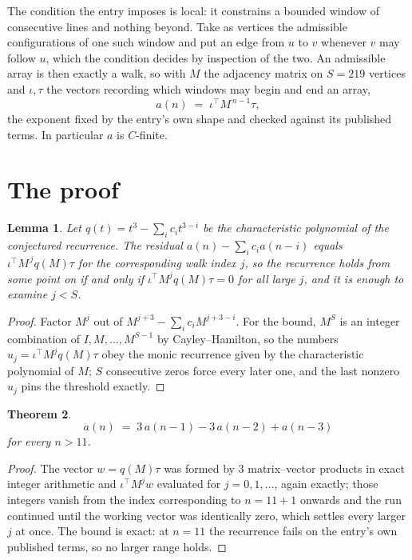 \documentclass[11pt,a4paper]{article}
\theoremstyle{plain}
\newtheorem{theorem}{Theorem}
\newtheorem{lemma}[theorem]{Lemma}
\theoremstyle{definition}
\begin{document}
The condition the entry imposes is local: it constrains a bounded window of consecutive lines and nothing beyond. Take as
vertices the admissible configurations of one such window and put an edge from $u$ to $v$
whenever $v$ may follow $u$, which the condition decides by inspection of the two. An
admissible array is then exactly a walk, so with $M$ the adjacency matrix on $S=219$ vertices
and $\iota,\tau$ the vectors recording which windows may begin and end an array,
\[
a(n)\;=\;\iota^{\!\top}M^{\,n-1}\tau ,
\]
the exponent fixed by the entry's own shape and checked against its published terms. In
particular $a$ is $C$-finite.

\section{The proof}

\begin{lemma}\label{lem:crit}
Let $q(t)=t^{3}-\sum_i c_it^{3-i}$ be the characteristic polynomial of the
conjectured recurrence. The residual $a(n)-\sum_ic_ia(n-i)$ equals
$\iota^{\!\top}M^{\,j}q(M)\tau$ for the corresponding walk index $j$, so the recurrence
holds from some point on if and only if $\iota^{\!\top}M^{j}q(M)\tau=0$ for all large $j$,
and it is enough to examine $j<S$.
\end{lemma}

\begin{proof}
Factor $M^{j}$ out of $M^{j+3}-\sum_ic_iM^{j+3-i}$. For the bound, $M^{S}$
is an integer combination of $I,M,\dots,M^{S-1}$ by Cayley--Hamilton, so the numbers
$u_j=\iota^{\!\top}M^{j}q(M)\tau$ obey the monic recurrence given by the characteristic
polynomial of $M$; $S$ consecutive zeros force every later one, and the last nonzero $u_j$
pins the threshold exactly.
\end{proof}

\begin{theorem}
\[
a(n)\;=\;3\,a(n-1) - 3\,a(n-2) + a(n-3)
\]
for every $n>11$.
\end{theorem}

\begin{proof}
The vector $w=q(M)\tau$ was formed by $3$ matrix--vector products in exact integer
arithmetic and $\iota^{\!\top}M^{j}w$ evaluated for $j=0,1,\dots$, again exactly; those
integers vanish from the index corresponding to $n=11+1$ onwards and the run continued
until the working vector was identically zero, which settles every larger $j$ at once. The bound is exact: at $n=11$ the recurrence fails on the entry's own published terms, so no larger range holds.
\end{proof}
\end{document}
